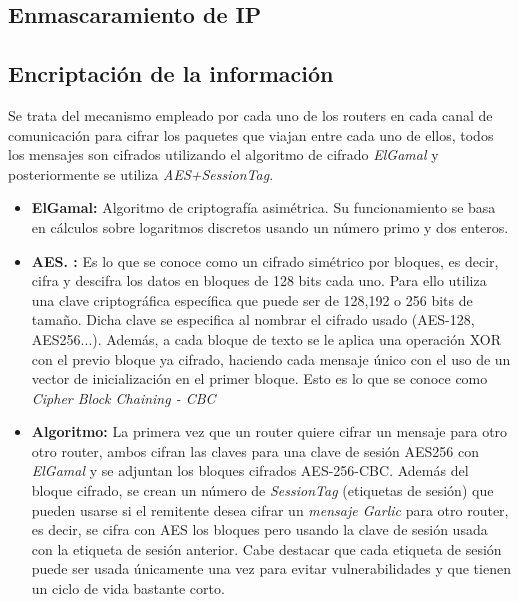 \subsection{Enmascaramiento de IP}

\subsection{Encriptación de la información}

Se trata del mecanismo empleado por cada uno de los routers en cada canal de comunicación para cifrar los paquetes que viajan entre cada uno de ellos, todos los mensajes son cifrados utilizando el algoritmo de cifrado \textit{ElGamal} y posteriormente se utiliza \textit{AES+SessionTag}.


\begin{itemize}

\item \textbf{ElGamal:}
Algoritmo de criptografía asimétrica. Su funcionamiento se basa en cálculos sobre logaritmos discretos usando un número primo y dos enteros.   


\item \textbf{AES. :}
Es lo que se conoce como un cifrado simétrico por bloques, es decir, cifra y descifra los datos en bloques de 128 bits cada uno. Para ello utiliza una clave criptográfica específica que puede ser de 128,192 o 256 bits de tamaño. Dicha clave se especifica al nombrar el cifrado usado (AES-128, AES256...). Además, a cada bloque de texto se le aplica una operación XOR con el previo bloque ya cifrado, haciendo cada mensaje único con el uso de un vector de inicialización en el primer bloque. Esto es lo que se conoce como \textit{Cipher Block Chaining - CBC} 

\textit{}

\item \textbf{Algoritmo:} La primera vez que un router quiere cifrar un mensaje para otro otro router, ambos cifran las claves para una clave de sesión AES256 con \textit{ElGamal} y se adjuntan los bloques cifrados  AES-256-CBC.
Además del bloque cifrado, se crean un número de \textit{SessionTag} (etiquetas de sesión) que pueden usarse si el remitente desea cifrar un \textit{mensaje Garlic} para otro router, es decir, se cifra con AES los bloques pero usando la clave de sesión usada con la etiqueta de sesión anterior. 
Cabe destacar que cada etiqueta de sesión puede ser usada únicamente una vez para evitar vulnerabilidades y que tienen un ciclo de vida bastante corto.


\end{itemize}


